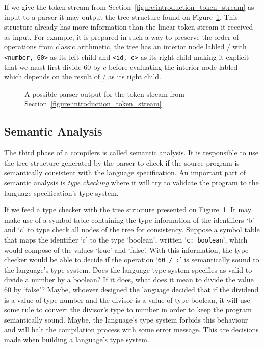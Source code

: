 \documentclass[english, lmodern, oneside, nopageanchorhack]{ufsc-thesis-rn46-2019}
\begin{document}
If we give the token stream from Section~\ref{figure:introduction_token_stream} as input to a parser it may output the tree structure found on Figure~\ref{figure:introduction_ast}.
This structure already has more information than the linear token stream it received as input.
For example, it is prepared in such a way to preserve the order of operations from classic arithmetic, the tree has an interior node labled $/$ with \verb+<number, 60>+ as its left child and \verb+<id, c>+ as its right child making it explicit that we must first divide $60$ by $c$ before evaluating the interior node labled $+$ which depends on the result of $/$ as its right child.

\begin{figure}
\caption{A possible parser output for the token stream from Section~\ref{figure:introduction_token_stream}}\label{figure:introduction_ast}
\centering
{}
\end{figure}

\subsection{Semantic Analysis}

The third phase of a compilers is called semantic analysis.
It is responsible to use the tree structure generated by the parser to check if the source program is semantically consistent with the language specification.
An important part of semantic analysis is \textit{type checking} where it will try to validate the program to the language specification's type system.

If we feed a type checker with the tree structure presented on Figure~\ref{figure:introduction_ast}.
It may make use of a symbol table containing the type information of the identifiers `b' and `c' to type check all nodes of the tree for consistency.
Suppose a symbol table that maps the identifier `c' to the type `boolean', written `\verb+c: boolean+', which would compose of the values `true' and `false'.
With this information, the type checker would be able to decide if the operation `\verb+60 / c+' is semantically sound to the language's type system.
Does the language type system specifies as valid to divide a number by a boolean?
If it does, what does it mean to divide the value 60 by `false'?
Maybe, whoever designed the language decided that if the dividend is a value of type number and the divisor is a value of type boolean, it will use some rule to convert the divisor's type to number in order to keep the program semantically sound.
Maybe, the language's type system forbids this behaviour and will halt the compilation process with some error message.
This are decisions made when building a language's type system.
\end{document}
